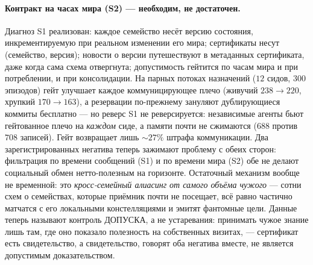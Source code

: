 \documentclass{article}
\begin{document}
\paragraph{Контракт на часах мира (S2) --- необходим, не достаточен.}
Диагноз S1 реализован: каждое семейство несёт версию состояния,
инкрементируемую при реальном изменении его мира; сертификаты несут
(семейство, версия); новости о версии путешествуют в метаданных
сертификата, даже когда сама схема отвергнута; допустимость гейтится
по часам мира и при потреблении, и при консолидации. На парных
потоках назначений ($12$ сидов, $300$ эпизодов) гейт улучшает каждое
коммуницирующее плечо (живучий $238 \to 220$, хрупкий $170 \to 163$),
а резервации по-прежнему зануляют дублирующиеся коммиты бесплатно ---
но реверс S1 не реверсируется: независимые агенты бьют гейтованное
плечо на \emph{каждом} сиде, а памяти почти не сжимаются ($688$
против $708$ записей). Гейт возвращает лишь ${\sim}27\%$ штрафа
коммуникации. Два зарегистрированных негатива теперь зажимают
проблему с обеих сторон: фильтрация по времени сообщений (S1) и по
времени мира (S2) обе не делают социальный обмен нетто-полезным на
горизонте. Остаточный механизм вообще не временной: это
\emph{кросс-семейный алиасинг от самого объёма чужого} --- сотни схем
о семействах, которые приёмник почти не посещает, всё равно частично
матчатся с его локальными констелляциями и эмитят фантомные цели.
Данные теперь называют контроль ДОПУСКА, а не устаревания: принимать
чужое знание лишь там, где оно показало полезность на собственных
визитах, --- сертификат есть свидетельство, а свидетельство, говорят
оба негатива вместе, не является допустимым доказательством.
\end{document}
